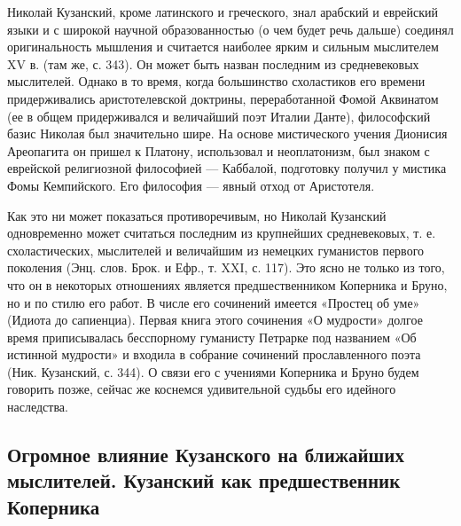 Николай Кузанский, кроме латинского и греческого, знал арабский и
еврейский языки и с широкой научной образованностью (о чем будет речь
дальше) соединял оригинальность мышления и считается наиболее ярким и
сильным мыслителем XV в. (там же, с. 343). Он может быть назван
последним из средневековых мыслителей. Однако в то время, когда
большинство схоластиков его времени придерживались аристотелевской
доктрины, переработанной Фомой Аквинатом (ее в общем придерживался и
величайший поэт Италии Данте), философский базис Николая был
значительно шире. На основе мистического учения Дионисия Ареопагита он
пришел к Платону, использовал и неоплатонизм, был знаком с еврейской
религиозной философией --- Каббалой, подготовку получил у мистика Фомы
Кемпийского. Его философия --- явный отход от Аристотеля.

Как это ни может показаться противоречивым, но Николай Кузанский
одновременно может считаться последним из крупнейших средневековых, т.
е. схоластических, мыслителей и величайшим из немецких гуманистов
первого поколения (Энц. слов. Брок. и Ефр., т. XXI, с. 117). Это ясно
не только из того, что он в некоторых отношениях является
предшественником Коперника и Бруно, но и по стилю его работ. В числе
его сочинений имеется «Простец об уме» (Идиота до сапиенциа). Первая
книга этого сочинения «О мудрости» долгое время приписывалась
бесспорному гуманисту Петрарке под названием «Об истинной мудрости» и
входила в собрание сочинений прославленного поэта (Ник. Кузанский, с.
344). О связи его с учениями Коперника и Бруно будем говорить позже,
сейчас же коснемся удивительной судьбы его идейного наследства.

\subsection{Огромное влияние Кузанского на ближайших мыслителей.
Кузанский как предшественник Коперника}

